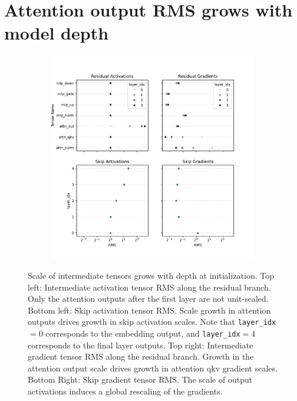 \section{Attention output RMS grows with model depth} 
\label{app:per_tensor_rms_summary}

\begin{figure}[!h]
    \centering
    \begin{subfigure}{\textwidth}
        \centering
        \includegraphics[width=\textwidth]{arXiv/figures/llama-acts-grads-rms.pdf}
    \end{subfigure}
    \caption{Scale of intermediate tensors grows with depth at initialization. Top left: Intermediate activation tensor RMS along the residual branch. Only the attention outputs after the first layer are not unit-scaled. Bottom left: Skip activation tensor RMS. Scale growth in attention outputs drives growth in skip activation scales. Note that \texttt{layer\_idx}$=0$ corresponds to the embedding output, and \texttt{layer\_idx}$=4$ corresponds to the final layer outputs. Top right: Intermediate gradient tensor RMS along the residual branch. Growth in the attention output scale drives growth in attention qkv gradient scales. Bottom Right: Skip gradient tensor RMS. The scale of output activations induces a global rescaling of the gradients.}
    \label{fig:acts-grads-rms}
\end{figure}

